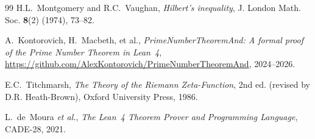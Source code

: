 \documentclass[11pt,a4paper]{article}
\begin{document}
\begin{thebibliography}{99}
H.L.~Montgomery and R.C.~Vaughan, \emph{Hilbert's inequality},
J. London Math. Soc. \textbf{8}(2) (1974), 73--82.

A.~Kontorovich, H.~Macbeth, et al., \emph{PrimeNumberTheoremAnd:
A formal proof of the Prime Number Theorem in Lean~4},
\url{https://github.com/AlexKontorovich/PrimeNumberTheoremAnd}, 2024--2026.

E.C.~Titchmarsh, \emph{The Theory of the Riemann Zeta-Function},
2nd ed. (revised by D.R. Heath-Brown), Oxford University Press, 1986.

L.~de~Moura \emph{et al.}, \emph{The Lean~4 Theorem Prover and Programming
Language}, CADE-28, 2021.

\end{thebibliography}
\end{document}
